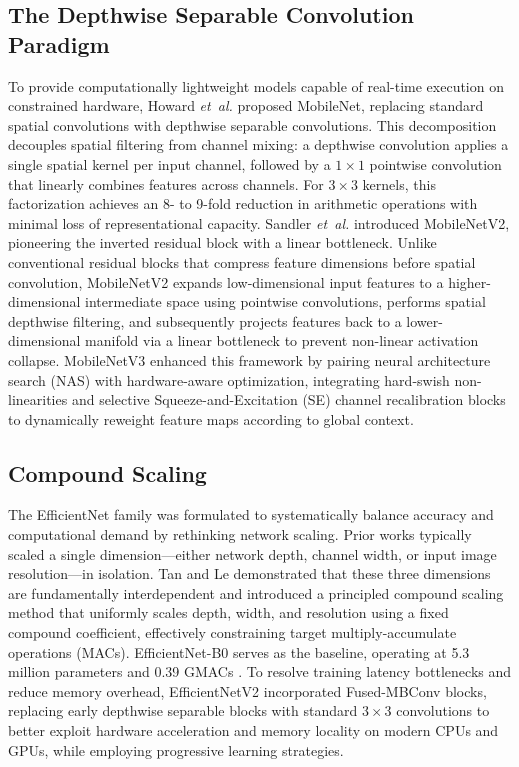 ﻿\documentclass[journal]{IEEEtran}
\begin{document}
\subsection{The Depthwise Separable Convolution Paradigm}
To provide computationally lightweight models capable of real-time execution on constrained hardware, Howard \emph{et~al.} \cite{15} proposed MobileNet, replacing standard spatial convolutions with depthwise separable convolutions. This decomposition decouples spatial filtering from channel mixing: a depthwise convolution applies a single spatial kernel per input channel, followed by a $1\times1$ pointwise convolution that linearly combines features across channels. For $3\times3$ kernels, this factorization achieves an 8- to 9-fold reduction in arithmetic operations with minimal loss of representational capacity. Sandler \emph{et~al.} \cite{37} introduced MobileNetV2, pioneering the inverted residual block with a linear bottleneck. Unlike conventional residual blocks that compress feature dimensions before spatial convolution, MobileNetV2 expands low-dimensional input features to a higher-dimensional intermediate space using pointwise convolutions, performs spatial depthwise filtering, and subsequently projects features back to a lower-dimensional manifold via a linear bottleneck to prevent non-linear activation collapse. MobileNetV3 \cite{19} enhanced this framework by pairing neural architecture search (NAS) \cite{50} with hardware-aware optimization, integrating hard-swish non-linearities and selective Squeeze-and-Excitation (SE) channel recalibration blocks \cite{16} to dynamically reweight feature maps according to global context.

\subsection{Compound Scaling}
The EfficientNet family \cite{40} was formulated to systematically balance accuracy and computational demand by rethinking network scaling. Prior works typically scaled a single dimension---either network depth, channel width, or input image resolution---in isolation. Tan and Le demonstrated that these three dimensions are fundamentally interdependent and introduced a principled compound scaling method that uniformly scales depth, width, and resolution using a fixed compound coefficient, effectively constraining target multiply-accumulate operations (MACs). EfficientNet-B0 serves as the baseline, operating at 5.3 million parameters and 0.39 GMACs \cite{40}. To resolve training latency bottlenecks and reduce memory overhead, EfficientNetV2 \cite{41} incorporated Fused-MBConv blocks, replacing early depthwise separable blocks with standard $3\times3$ convolutions to better exploit hardware acceleration and memory locality on modern CPUs and GPUs, while employing progressive learning strategies.
\end{document}
